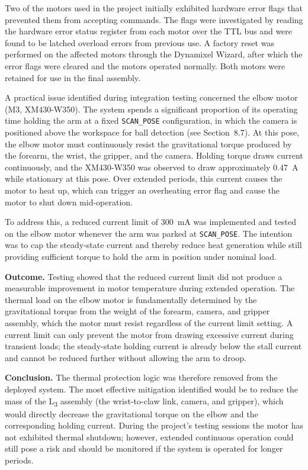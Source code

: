 Two of the motors used in the project initially exhibited 
hardware error flags that prevented them from accepting commands. 
The flags were investigated by reading the hardware error status 
register from each motor over the TTL bus and were found to be 
latched overload errors from previous use. A factory reset was 
performed on the affected motors through the Dynamixel Wizard, 
after which the error flags were cleared and the motors operated 
normally. Both motors were retained for use in the final assembly.

A practical issue identified during integration testing concerned 
the elbow motor (M3, XM430-W350). The system spends a significant 
proportion of its operating time holding the arm at a fixed 
\texttt{SCAN\_POSE} configuration, in which the camera is positioned 
above the workspace for ball detection (see Section~8.7). 
At this pose, the elbow motor must continuously resist the 
gravitational torque produced by the forearm, the wrist, the 
gripper, and the camera. Holding torque draws current 
continuously, and the XM430-W350 was observed to draw 
approximately 0.47~A while stationary at this pose. Over extended 
periods, this current causes the motor to heat up, which can 
trigger an overheating error flag and cause the motor to shut 
down mid-operation.

To address this, a reduced current limit of 300~mA was
implemented and tested on the elbow motor whenever the arm
was parked at \texttt{SCAN\_POSE}. The intention was to cap
the steady-state current and thereby reduce heat generation
while still providing sufficient torque to hold the arm in
position under nominal load.

\textbf{Outcome.}
Testing showed that the reduced current limit did not
produce a measurable improvement in motor temperature
during extended operation. The thermal load on the elbow
motor is fundamentally determined by the gravitational
torque from the weight of the forearm, camera, and gripper
assembly, which the motor must resist regardless of the
current limit setting. A current limit can only prevent
the motor from drawing excessive current during transient
loads; the steady-state holding current is already below
the stall current and cannot be reduced further without
allowing the arm to droop.

\textbf{Conclusion.}
The thermal protection logic was therefore removed from the
deployed system. The most effective mitigation identified
would be to reduce the mass of the L\textsubscript{3}
assembly (the wrist-to-claw link, camera, and gripper),
which would directly decrease the gravitational torque on
the elbow and the corresponding holding current. During
the project's testing sessions the motor has not exhibited
thermal shutdown; however, extended continuous operation
could still pose a risk and should be monitored if the
system is operated for longer periods.